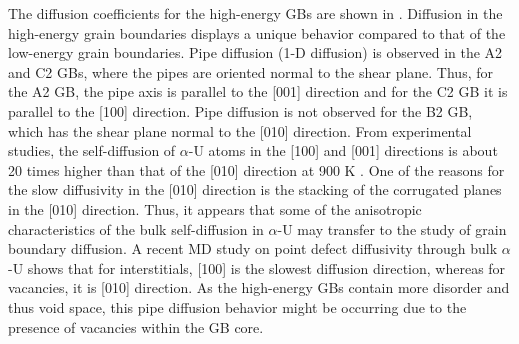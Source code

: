\documentclass[review]{elsarticle}
\begin{document}
\par The diffusion coefficients for the high-energy GBs are shown in . Diffusion in the high-energy grain boundaries displays a unique behavior compared to that of the low-energy grain boundaries. Pipe diffusion (1-D diffusion) is observed in the A2 and C2 GBs, where the pipes are oriented normal to the shear plane. Thus, for the A2 GB, the pipe axis is parallel to the [001] direction and for the C2 GB it is parallel to the [100] direction. 
Pipe diffusion is not observed for the B2 GB, which has the shear plane normal to the [010] direction. From experimental studies, the self-diffusion of $\alpha$-U atoms in the [100] and [001] directions is about 20 times higher than that of the [010] direction at 900 K \cite{aniso_self_diff}. One of the reasons for the slow diffusivity in the [010] direction is the stacking of the corrugated planes in the [010] direction. Thus, it appears that some of the anisotropic characteristics of the bulk self-diffusion in $\alpha$-U may transfer to the study of grain boundary diffusion. A recent MD study \cite{WANG2023154289} on point defect diffusivity through bulk $\alpha$-U shows that for interstitials, [100] is the slowest diffusion direction, whereas for vacancies, it is [010] direction. As the high-energy GBs contain more disorder and thus void space, this pipe diffusion behavior might be occurring due to the presence of vacancies within the GB core.
\end{document}
